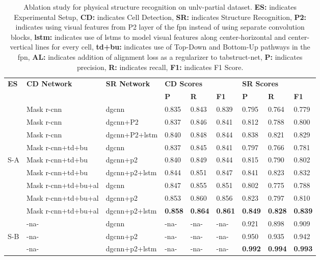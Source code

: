 \documentclass[runningheads]{llncs}
\begin{document}
\begin{table}\addtolength{\tabcolsep}{-1.0pt}
\begin{center}
\begin{tabular}{|l|l |l |l l l| l l l|} \hline
\textbf{ES} &\textbf{CD Network} & \textbf{SR Network} &\multicolumn{3}{l|}{\textbf{CD Scores}} &\multicolumn{3}{l|}{\textbf{SR Scores}} \\ \cline{4-9}
 &  &   &\textbf{P} &\textbf{R} &\textbf{F1} &\textbf{P} &\textbf{R} &\textbf{F1} \\ \hline
&Mask {\sc r-cnn} &{\sc dgcnn} &0.835 &0.843 &0.839	&0.795 &0.764 &0.779 \\
&Mask {\sc r-cnn} &{\sc dgcnn}+P2 &0.837 &0.846	&0.841 &0.812 &0.788 &0.800 \\
&Mask {\sc r-cnn} &{\sc dgcnn}+P2+{\sc lstm} &0.840	&0.848 &0.844 &0.838 &0.821	&0.829 \\ \cline{2-9}
&Mask {\sc r-cnn}+{\sc td}+{\sc bu} &{\sc dgcnn} &0.837	&0.845 &0.841 &0.797 &0.766	&0.781 \\
S-A &Mask {\sc r-cnn}+{\sc td}+{\sc bu} &{\sc dgcnn}+{\sc p}2 &0.840 &0.849	&0.844 &0.815 &0.790 &0.802 \\ 
&Mask {\sc r-cnn}+{\sc td}+{\sc bu}	&{\sc dgcnn}+{\sc p}2+{\sc lstm} &0.844	&0.851 &0.847 &0.841 &0.823	&0.832 \\ \cline{2-9}
&Mask {\sc r-cnn}+{\sc td}+{\sc bu}+{\sc al} &{\sc dgcnn} &0.847 &0.855	&0.851 &0.802 &0.775 &0.788 \\	
&Mask {\sc r-cnn}+{\sc td}+{\sc bu}+{\sc al} &{\sc dgcnn}+{\sc p}2 &0.853 &0.860 &0.856	&0.823 &0.797 &0.810 \\
&Mask {\sc r-cnn}+{\sc td}+{\sc bu}+{\sc al} &{\sc dgcnn}+{\sc p}2+{\sc lstm} &\textbf{0.858} &\textbf{0.864}	&\textbf{0.861}	&\textbf{0.849} &\textbf{0.828}	&\textbf{0.839} \\ \hline
 & -{\sc na}- &{\sc dgcnn} & -{\sc na}- & -{\sc na}-  & -{\sc na}- &0.921 &0.898 &0.909 \\ 
S-B & -{\sc na}- &{\sc dgcnn}+{\sc p}2  & -{\sc na}- & -{\sc na}- & -{\sc na}- &0.950 &0.935 &0.942 \\
  & -{\sc na}-  &{\sc dgcnn}+{\sc p}2+{\sc lstm} & -{\sc na}- & -{\sc na}- & -{\sc na}- &\textbf{0.992} &\textbf{0.994}	&\textbf{0.993} \\ \hline 
\end{tabular}
\end{center}
\caption{Ablation study for physical structure recognition on {\sc unlv}-partial dataset. \textbf{ES:} indicates Experimental Setup, \textbf{CD:} indicates Cell Detection, \textbf{SR:} indicates Structure Recognition, \textbf{P2:} indicates using visual features from P2 layer of the {\sc fpn} instead of using separate convolution blocks, \textbf{{\sc lstm}:} indicates use of {\sc lstm}s to model visual features along center-horizontal and center-vertical lines for every cell, \textbf{{\sc td}+{\sc bu}:} indicates use of Top-Down and Bottom-Up pathways in the {\sc fpn}, \textbf{AL:} indicates addition of alignment loss as a regularizer to {\sc t}ab{\sc s}truct-{\sc n}et, \textbf{P:} indicates precision, \textbf{R:} indicates recall, \textbf{F1:} indicates F1 Score. \label{table_ablation_study_physical_unlv_partial}}

\end{table}
\end{document}
